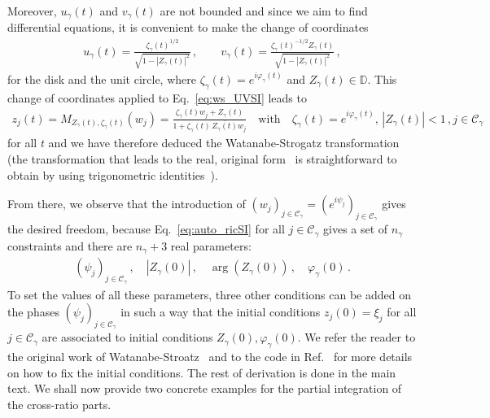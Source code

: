 \documentclass[aps,pre,reprint,longbibliography,superscriptaddress,noshowpacs,floatfix]{revtex4-2}
\theoremstyle{definition}
\theoremstyle{remark}
\begin{document}
Moreover, $u_{\gamma}(t)$ and $v_{\gamma}(t)$ are not bounded and since we aim to find differential equations, it is convenient to make the change of coordinates
\begin{align*}
    u_{\gamma}(t) = \frac{\zeta_{\gamma}(t)^{1/2}}{\sqrt{1 - |Z_{\gamma}(t)|^2}}\,,\qquad v_{\gamma}(t) = \frac{\zeta_{\gamma}(t)^{-1/2}Z_{\gamma}(t)}{\sqrt{1 - |Z_{\gamma}(t)|^2}}\,,
\end{align*}
for the disk and the unit circle, where $\zeta_{\gamma}(t) = e^{i\varphi_\gamma(t)}$ and $Z_{\gamma}(t) \in \mathbb{D}$. This change of coordinates applied to Eq.~\eqref{eq:ws_UVSI} leads to 
\begin{align}\label{eq:auto_ricSI}
    z_j(t) = M_{Z_{\gamma}(t), \zeta_{\gamma}(t)}(w_j) = \frac{\zeta_{\gamma}(t)w_j + Z_{\gamma}(t)}{1 + \zeta_{\gamma}(t)\,\overline{Z_{\gamma}(t)}w_j}\quad \mathrm{with}\quad \zeta_{\gamma}(t) = e^{i\varphi_{\gamma}(t)},\, |Z_{\gamma}(t)| < 1\,,j\in \mathcal{C}_\gamma\,
\end{align}
for all $t$ and we have therefore deduced the Watanabe-Strogatz transformation (the transformation that leads to the real, original form~\cite{Watanabe1994} is straightforward to obtain by using trigonometric identities~\cite[IV, A]{Marvel2009}). 

From there, we observe that the introduction of $(w_j)_{j\in \mathcal{C}_\gamma} = (e^{i\psi_j})_{j\in \mathcal{C}_\gamma}$ gives the desired freedom, because Eq.~\eqref{eq:auto_ricSI} for all $j \in \mathcal{C}_\gamma$ gives a set of $n_{\gamma}$ constraints and there are $n_{\gamma} + 3$ real parameters:
\begin{align*}
    (\psi_j)_{j\in \mathcal{C}_\gamma}\,,\quad|Z_{\gamma}(0)|\,,\quad \arg(Z_{\gamma}(0))\,,\quad \varphi_{\gamma}(0)\,.
\end{align*}
To set the values of all these parameters, three other conditions can be added on the phases $(\psi_j)_{j\in \mathcal{C}_\gamma}$ in such a way that the initial conditions $z_j(0)=\xi_j$ for all $j \in \mathcal{C}_\gamma$ are associated to initial conditions $Z_{\gamma}(0), \varphi_{\gamma}(0)$. We refer the reader to the original work of Watanabe-Stroatz~\cite{Watanabe1994} and to the code in Ref.~\cite{Thibeault2026_koopman_kuramoto} for more details on how to fix the initial conditions. The rest of derivation is done in the main text. We shall now provide two concrete examples for the partial integration of the cross-ratio parts.

\end{document}
